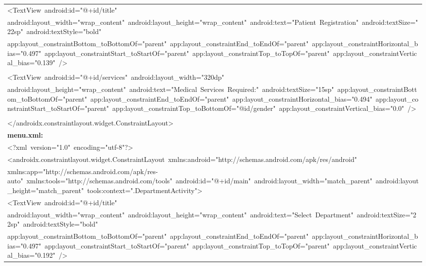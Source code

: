 \documentclass[a4paper,12pt]{article}
\begin{document}
\begin{longtable}{|p{}|}
{\ttfamily\small \textless{}TextView\ android:id="@+id/title"} \\
{\ttfamily\small android:layout\_width="wrap\_content"\ android:layout\_height="wrap\_content"\ android:text="Patient\ Registration"\ android:textSize="22sp"\ android:textStyle="bold"} \\
{\ttfamily\small app:layout\_constraintBottom\_toBottomOf="parent"\ app:layout\_constraintEnd\_toEndOf="parent"\ app:layout\_constraintHorizontal\_bias="0.497"\ app:layout\_constraintStart\_toStartOf="parent"\ app:layout\_constraintTop\_toTopOf="parent"\ app:layout\_constraintVertical\_bias="0.139"\ /\textgreater{}} \\
\strut \\
{\ttfamily\small \textless{}TextView\ android:id="@+id/services"\ android:layout\_width="320dp"} \\
{\ttfamily\small android:layout\_height="wrap\_content"\ android:text="Medical\ Services\ Required:"\ android:textSize="15sp"\ app:layout\_constraintBottom\_toBottomOf="parent"\ app:layout\_constraintEnd\_toEndOf="parent"\ app:layout\_constraintHorizontal\_bias="0.494"\ app:layout\_constraintStart\_toStartOf="parent"\ app:layout\_constraintTop\_toBottomOf="@id/gender"\ app:layout\_constraintVertical\_bias="0.0"\ /\textgreater{}} \\
\strut \\
{\ttfamily\small \textless{}/androidx.constraintlayout.widget.ConstraintLayout\textgreater{}} \\
\hline
\rule{0pt}{13pt}\textbf{menu.xml:} \\
\hline
{\ttfamily\small \textless{}?xml\ version="1.0"\ encoding="utf-8"?\textgreater{}} \\
{\ttfamily\small \textless{}androidx.constraintlayout.widget.ConstraintLayout\ xmlns:android="http://schemas.android.com/apk/res/android"} \\
{\ttfamily\small xmlns:app="http://schemas.android.com/apk/res-auto"\ xmlns:tools="http://schemas.android.com/tools"\ android:id="@+id/main"\ android:layout\_width="match\_parent"\ android:layout\_height="match\_parent"\ tools:context=".DepartmentActivity"\textgreater{}} \\
{\ttfamily\small \textless{}TextView\ android:id="@+id/title"} \\
{\ttfamily\small android:layout\_width="wrap\_content"\ android:layout\_height="wrap\_content"\ android:text="Select\ Department"\ android:textSize="22sp"\ android:textStyle="bold"} \\
{\ttfamily\small app:layout\_constraintBottom\_toBottomOf="parent"\ app:layout\_constraintEnd\_toEndOf="parent"\ app:layout\_constraintHorizontal\_bias="0.497"\ app:layout\_constraintStart\_toStartOf="parent"\ app:layout\_constraintTop\_toTopOf="parent"\ app:layout\_constraintVertical\_bias="0.192"\ /\textgreater{}} \\

\end{longtable}
\end{document}
